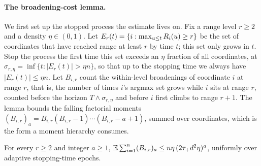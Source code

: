 \paragraph{The broadening-cost lemma.}
We first set up the stopped process the estimate lives on. Fix a range level $r\ge2$ and a density $\eta\in(0,1)$. Let
$E_r(t)=\{i:\max_{u\le t}R_i(u)\ge r\}$ be the set of coordinates that have reached range at least $r$ by time $t$;
this set only grows in $t$. Stop the process the first time this set exceeds an $\eta$ fraction of all coordinates, at
$\sigma_{r,\eta}=\inf\{t:|E_r(t)|>\eta n\}$, so that up to the stopping time we always have $|E_r(t)|\le\eta n$. Let $B_{i,r}$
count the within-level broadenings of coordinate $i$ at range $r$, that is, the number of times $i$'s argmax set grows while
$i$ sits at range $r$, counted before the horizon $T\wedge\sigma_{r,\eta}$ and before $i$ first climbs to range $r+1$. The
lemma bounds the falling factorial moments $(B_{i,r})_a=B_{i,r}(B_{i,r}-1)\cdots(B_{i,r}-a+1)$, summed over coordinates, which
is the form a moment hierarchy consumes.

\begin{lemma}\label{lem:bc}
For every $r\ge2$ and integer $a\ge1$,
$\mathbb{E}\sum_{i=1}^n (B_{i,r})_a\le n\eta\,(2\tau_+ d^2\eta)^{a}$, uniformly over adaptive stopping-time epochs.
\end{lemma}

